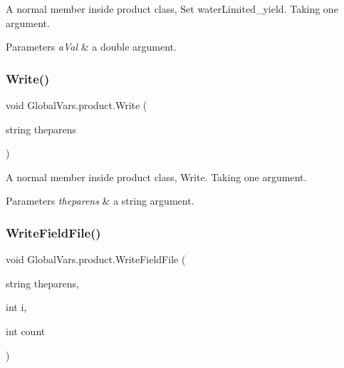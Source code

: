 A normal member inside product class, Set water\+Limited\+\_\+yield. Taking one argument. 


\begin{DoxyParams}{Parameters}
{\em a\+Val} & a double argument. \\
\hline
\end{DoxyParams}
\mbox{\label{class_global_vars_1_1product_a5d04c99bd5f354667c9158942c3e0019}} 
\subsubsection{\texorpdfstring{Write()}{Write()}}
{\footnotesize\ttfamily void Global\+Vars.\+product.\+Write (\begin{DoxyParamCaption}\item[{string}]{theparens }\end{DoxyParamCaption})\hspace{0.3cm}{\ttfamily [inline]}}



A normal member inside product class, Write. Taking one argument. 


\begin{DoxyParams}{Parameters}
{\em theparens} & a string argument. \\
\hline
\end{DoxyParams}
\mbox{\label{class_global_vars_1_1product_a251b65f82d40438bd78bc7fdb8536e8b}} 
\subsubsection{\texorpdfstring{WriteFieldFile()}{WriteFieldFile()}}
{\footnotesize\ttfamily void Global\+Vars.\+product.\+Write\+Field\+File (\begin{DoxyParamCaption}\item[{string}]{theparens,  }\item[{int}]{i,  }\item[{int}]{count }\end{DoxyParamCaption})\hspace{0.3cm}{\ttfamily [inline]}}



